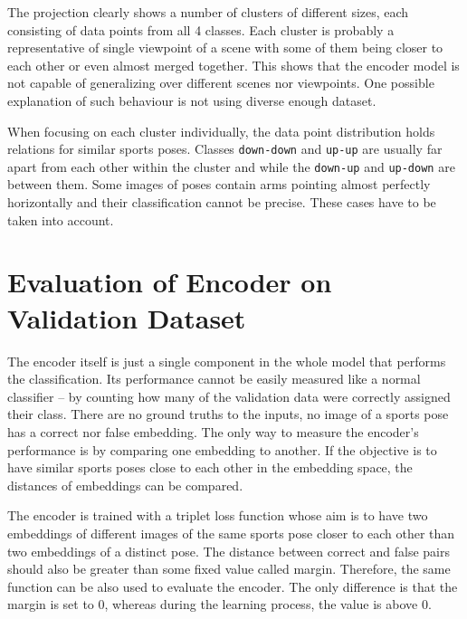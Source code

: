 The projection clearly shows a number of clusters of different sizes, each consisting of data points from all 4 classes. Each cluster is probably a representative of single viewpoint of a scene with some of them being closer to each other or even almost merged together. This shows that the encoder model is not capable of generalizing over different scenes nor viewpoints. One possible explanation of such behaviour is not using diverse enough dataset.

When focusing on each cluster individually, the data point distribution holds relations for similar sports poses. Classes \texttt{down-down} and \texttt{up-up} are usually far apart from each other within the cluster and while the \texttt{down-up} and \texttt{up-down} are between them. Some images of poses contain arms pointing almost perfectly horizontally and their classification cannot be precise. These cases have to be taken into account.

\section{\label{sec:evaluate-encoder}Evaluation of Encoder on Validation Dataset}

The encoder itself is just a single component in the whole model that performs the classification. Its performance cannot be easily measured like a normal classifier -- by counting how many of the validation data were correctly assigned their class. There are no ground truths to the inputs, no image of a sports pose has a correct nor false embedding. The only way to measure the encoder's performance is by comparing one embedding to another. If the objective is to have similar sports poses close to each other in the embedding space, the distances of embeddings can be compared.

The encoder is trained with a triplet loss function whose aim is to have two embeddings of different images of the same sports pose closer to each other than two embeddings of a distinct pose. The distance between correct and false pairs should also be greater than some fixed value called margin. Therefore, the same function can be also used to evaluate the encoder. The only difference is that the margin is set to 0, whereas during the learning process, the value is above 0.

